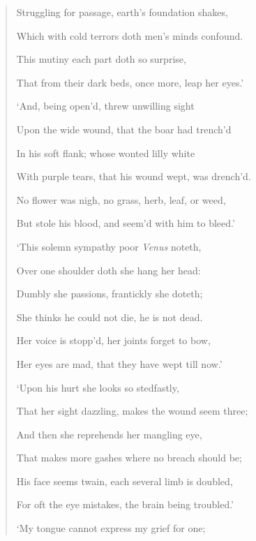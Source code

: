 \documentclass[a4paper, 11pt, oneside, polutonikogreek, english]{article}
\begin{document}
\begin{quotation}
Struggling for passage, earth's foundation shakes,

Which with cold terrors doth men's minds confound.

\hspace*{15mm}This mutiny each part doth so surprise,

\hspace*{15mm}That from their dark beds, once more, leap her eyes.'

\bigskip

`And, being open'd, threw unwilling sight

Upon the wide wound, that the boar had trench'd

In his soft flank; whose wonted lilly white

With purple tears, that his wound wept, was drench'd.

\hspace*{15mm}No flower was nigh, no grass, herb, leaf, or weed,

\hspace*{15mm}But stole his blood, and seem'd with him to bleed.'

\bigskip

`This solemn sympathy poor \emph{Venus} noteth,

Over one shoulder doth she hang her head:

Dumbly she passions, frantickly she doteth;

She thinks he could not die, he is not dead.

\hspace*{15mm}Her voice is stopp'd, her joints forget to bow,

\hspace*{15mm}Her eyes are mad, that they have wept till now.'

\bigskip

`Upon his hurt she looks so stedfastly,

That her sight dazzling, makes the wound seem three;

And then she reprehends her mangling eye,

That makes more gashes where no breach should be;

\hspace*{15mm}His face seems twain, each several limb is doubled,

\hspace*{15mm}For oft the eye mistakes, the brain being troubled.'

\bigskip

`My tongue cannot express my grief for one;


\end{quotation}
\end{document}
